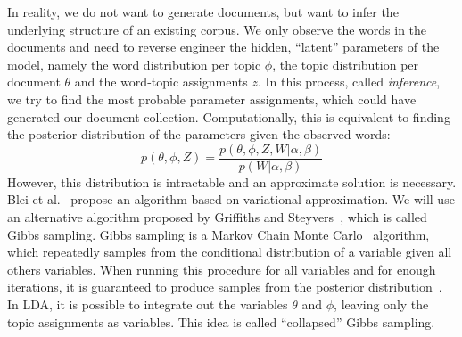 \documentclass[
        a4paper,
        titlepage,
        twoside,
        parskip
        ]{scrbook}
\theoremstyle{break}
\begin{document}
In reality, we do not want to generate documents, but want to infer the underlying structure of an existing corpus.
We only observe the words in the documents and need to reverse engineer the hidden, ``latent'' parameters of the model, namely the word distribution per topic $\phi$, the topic distribution per document $\theta$ and the word-topic assignments $z$.
In this process, called \emph{inference}, we try to find the most probable parameter assignments, which could have generated our document collection.
Computationally, this is equivalent to finding the posterior distribution of the parameters given the observed words:
\begin{equation*}
  p(\theta, \phi, Z) = \frac{p(\theta, \phi, Z, W | \alpha, \beta)}{p(W|\alpha, \beta)}
\end{equation*}
However, this distribution is intractable and an approximate solution is necessary.
Blei et al.~\cite{Blei2003} propose an algorithm based on variational approximation.
We will use an alternative algorithm proposed by Griffiths and Steyvers~\cite{Griffiths2004}, which is called Gibbs sampling.
Gibbs sampling is a Markov Chain Monte Carlo~\cite{Gilks1996} algorithm, which repeatedly samples from the conditional distribution of a variable given all others variables.
When running this procedure for all variables and for enough iterations, it is guaranteed to produce samples from the posterior distribution~\cite{Gilks1996}.
In LDA, it is possible to integrate out the variables $\theta$ and $\phi$, leaving only the topic assignments as variables.
This idea is called ``collapsed'' Gibbs sampling.
\end{document}
